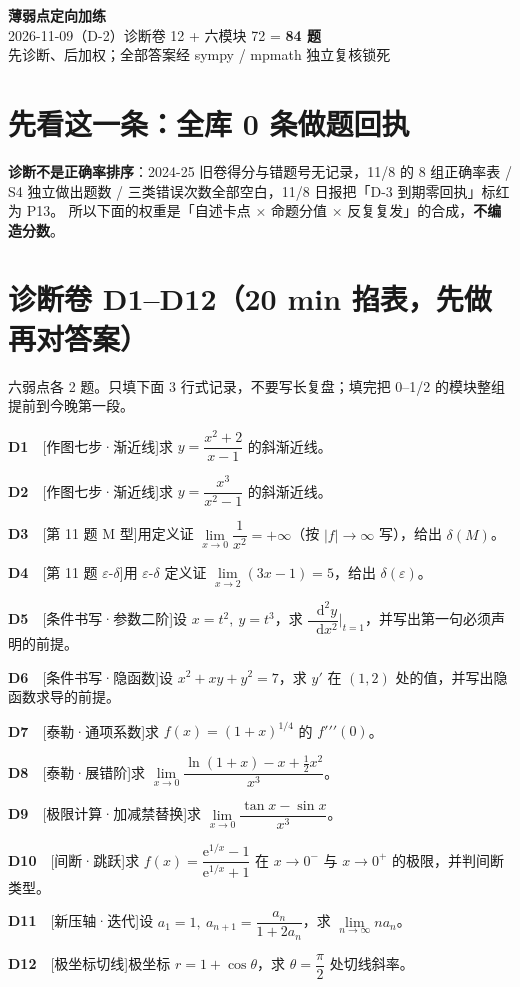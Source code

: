 \documentclass[11pt,a4paper]{ctexart}
\newcommand{\eps}{\varepsilon}
\newcommand{\ee}{\mathrm{e}}
\newcommand{\dd}{\mathop{}\!\mathrm{d}}
\newcommand{\qi}[3]{\par\noindent\textbf{#1}\ \ {\footnotesize[#2]}\quad #3\par\smallskip}
\begin{document}
\begin{center}
{\LARGE\bfseries 薄弱点定向加练}\\[0.3em]
{\large 2026-11-09（D-2）\quad 诊断卷 12 + 六模块 72 = \textbf{84 题}}\\[0.3em]
{\small 先诊断、后加权；全部答案经 sympy / mpmath 独立复核锁死}
\end{center}
\begin{center}
\end{center}
\section{先看这一条：全库 0 条做题回执}
\textbf{诊断不是正确率排序}：2024-25 旧卷得分与错题号无记录，11/8 的 8 组正确率表 / S4 独立做出题数 / 三类错误次数全部空白，11/8 日报把「D-3 到期零回执」标红为 P13。
所以下面的权重是「自述卡点 × 命题分值 × 反复复发」的合成，\textbf{不编造分数}。
\section{诊断卷 D1--D12（20 min 掐表，先做再对答案）}
六弱点各 2 题。只填下面 3 行式记录，不要写长复盘；填完把 0--1/2 的模块整组提前到今晚第一段。
\qi{D1}{作图七步·渐近线}{求 $y=\dfrac{x^{2}+2}{x-1}$ 的斜渐近线。}
\qi{D2}{作图七步·渐近线}{求 $y=\dfrac{x^{3}}{x^{2}-1}$ 的斜渐近线。}
\qi{D3}{第 11 题 M 型}{用定义证 $\lim\limits_{x\to0}\dfrac1{x^{2}}=+\infty$（按 $|f|\to\infty$ 写），给出 $\delta(M)$。}
\qi{D4}{第 11 题 $\eps$-$\delta$}{用 $\eps$-$\delta$ 定义证 $\lim\limits_{x\to2}(3x-1)=5$，给出 $\delta(\eps)$。}
\qi{D5}{条件书写·参数二阶}{设 $x=t^{2},\ y=t^{3}$，求 $\dfrac{\dd^{2}y}{\dd x^{2}}\big|_{t=1}$，并写出第一句必须声明的前提。}
\qi{D6}{条件书写·隐函数}{设 $x^{2}+xy+y^{2}=7$，求 $y\prime$ 在 $(1,2)$ 处的值，并写出隐函数求导的前提。}
\qi{D7}{泰勒·通项系数}{求 $f(x)=(1+x)^{1/4}$ 的 $f\prime\prime\prime(0)$。}
\qi{D8}{泰勒·展错阶}{求 $\lim\limits_{x\to0}\dfrac{\ln(1+x)-x+\tfrac12x^{2}}{x^{3}}$。}
\qi{D9}{极限计算·加减禁替换}{求 $\lim\limits_{x\to0}\dfrac{\tan x-\sin x}{x^{3}}$。}
\qi{D10}{间断·跳跃}{求 $f(x)=\dfrac{\ee^{1/x}-1}{\ee^{1/x}+1}$ 在 $x\to0^{-}$ 与 $x\to0^{+}$ 的极限，并判间断类型。}
\qi{D11}{新压轴·迭代}{设 $a_1=1,\ a_{n+1}=\dfrac{a_n}{1+2a_n}$，求 $\lim\limits_{n\to\infty} n a_n$。}
\qi{D12}{极坐标切线}{极坐标 $r=1+\cos\theta$，求 $\theta=\dfrac\pi2$ 处切线斜率。}
\end{document}
